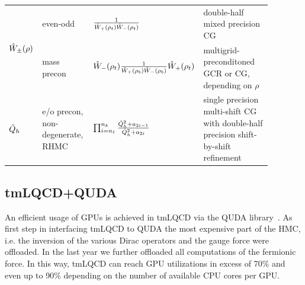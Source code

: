 \documentclass[a0,portrait]{a0poster}
\begin{document}
\begin{multicols}{2}
    \begin{tabular}{p{0.08\linewidth}p{0.2\linewidth}p{0.3\linewidth}p{0.3\linewidth}}
    \multirow{2}{*}{$\hat{W}_\pm(\rho)$} & even-odd & \centering $\frac{1}{\hat{W}_{+}(\rho_t) \hat{W}_{-}(\rho_t)}$ & double-half mixed precision CG \\
      & mass precon & \centering $\hat{W}_{-}(\rho_t) \frac{1}{\hat{W}_{+}(\rho_b) \hat{W}_{-}(\rho_b)} \hat{W}_{+}(\rho_t)$ & multigrid-preconditoned GCR or CG, depending on $\rho$ \\
      $\hat{Q}_h$ & e/o precon, non-degenerate, RHMC & \centering $\prod_{i=n_\ell}^{n_k} \frac{ \hat{Q}^2_h + a_{2i-1} }{ \hat{Q}^2_h + a_{2i} }$ & single precision multi-shift CG with double-half precision shift-by-shift refinement
    \end{tabular}

    \subsection*{tmLQCD+QUDA}

    An efficient usage of GPUs is achieved in tmLQCD via the QUDA library~\cite{Clark:2009wm,Babich:2011np}. As first step in interfacing tmLQCD to QUDA \cite{Kostrzewa:2022hsv} the most expensive part of the HMC, i.e. the inversion of the various Dirac operators and the gauge force were offloaded. In the last year we further offloaded all computations of the fermionic force. In this way, tmLQCD can reach GPU utilizations in excess of 70\% and even up to 90\% depending on the number of available CPU cores per GPU.


\end{multicols}
\end{document}
